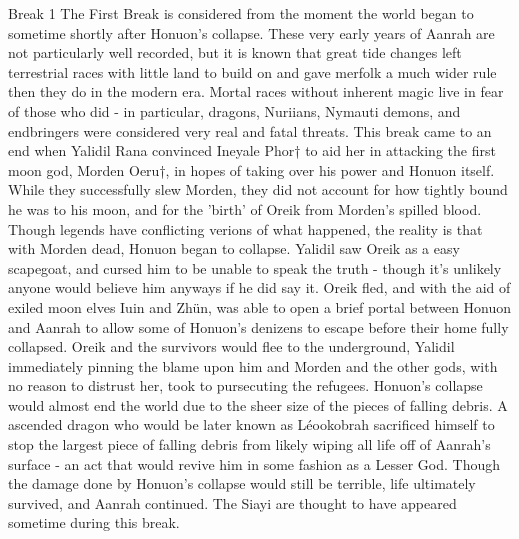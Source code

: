 Break 1
The First Break is considered from the moment the world began to sometime shortly after Honuon's collapse. These very early years of Aanrah are not particularly well recorded, but it is known that great tide changes left terrestrial races with little land to build on and gave merfolk a much wider rule then they do in the modern era. Mortal races without inherent magic live in fear of those who did - in particular, dragons, Nuriians, Nymauti demons, and endbringers were considered very real and fatal threats.
This break came to an end when Yalidil Rana convinced Ineyale Phor† to aid her in attacking the first moon god, Morden Oeru†, in hopes of taking over his power and Honuon itself. While they successfully slew Morden, they did not account for how tightly bound he was to his moon, and for the 'birth' of Oreik from Morden's spilled blood. Though legends have conflicting verions of what happened, the reality is that with Morden dead, Honuon began to collapse. Yalidil saw Oreik as a easy scapegoat, and cursed him to be unable to speak the truth - though it's unlikely anyone would believe him anyways if he did say it. Oreik fled, and with the aid of exiled moon elves Iuin and Zhün, was able to open a brief portal between Honuon and Aanrah to allow some of Honuon's denizens to escape before their home fully collapsed. Oreik and the survivors would flee to the underground, Yalidil immediately pinning the blame upon him and Morden and the other gods, with no reason to distrust her, took to pursecuting the refugees.
Honuon's collapse would almost end the world due to the sheer size of the pieces of falling debris. A ascended dragon who would be later known as Léookobrah sacrificed himself to stop the largest piece of falling debris from likely wiping all life off of Aanrah's surface - an act that would revive him in some fashion as a Lesser God. Though the damage done by Honuon's collapse would still be terrible, life ultimately survived, and Aanrah continued.
The Siayi are thought to have appeared sometime during this break.

